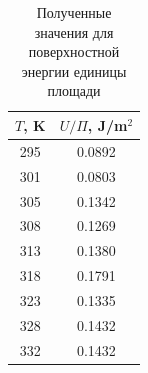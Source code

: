 \documentclass[a4paper,12pt]{report}
\begin{document}
    \begin{table}[H]
        \centering
        \begin{tabular}{|c|c|}
            \hline
            $T$, K & $U/\Pi$, J/m$^2$ \\
            \hline
            295 & 0.0892 \\
            \hline
            301 & 0.0803 \\
            \hline
            305 & 0.1342 \\
            \hline
            308 & 0.1269 \\
            \hline
            313 & 0.1380 \\
            \hline
            318 & 0.1791 \\
            \hline
            323 & 0.1335 \\
            \hline
            328 & 0.1432 \\
            \hline
            332 & 0.1432 \\
            \hline
        \end{tabular}
        \caption{Полученные значения для поверхностной энергии единицы площади}
    \end{table}
\end{document}
